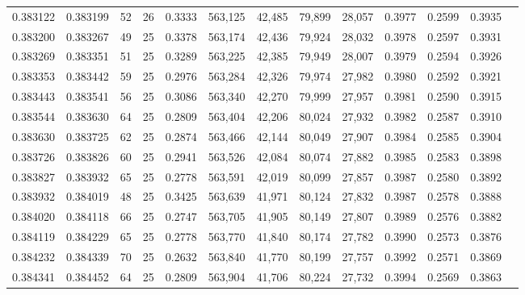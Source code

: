 \begin{tabular}{rrrrrrrrrrrrr}
0.383122 & 0.383199 &    52 &  26 &                                     0.3333 & 563,125 &  42,485 &  79,899 &  28,057 & 0.3977 & 0.2599 & 0.3935 \\
0.383200 & 0.383267 &    49 &  25 &                                     0.3378 & 563,174 &  42,436 &  79,924 &  28,032 & 0.3978 & 0.2597 & 0.3931 \\
0.383269 & 0.383351 &    51 &  25 &                                     0.3289 & 563,225 &  42,385 &  79,949 &  28,007 & 0.3979 & 0.2594 & 0.3926 \\
0.383353 & 0.383442 &    59 &  25 &                                     0.2976 & 563,284 &  42,326 &  79,974 &  27,982 & 0.3980 & 0.2592 & 0.3921 \\
0.383443 & 0.383541 &    56 &  25 &                                     0.3086 & 563,340 &  42,270 &  79,999 &  27,957 & 0.3981 & 0.2590 & 0.3915 \\
0.383544 & 0.383630 &    64 &  25 &                                     0.2809 & 563,404 &  42,206 &  80,024 &  27,932 & 0.3982 & 0.2587 & 0.3910 \\
0.383630 & 0.383725 &    62 &  25 &                                     0.2874 & 563,466 &  42,144 &  80,049 &  27,907 & 0.3984 & 0.2585 & 0.3904 \\
0.383726 & 0.383826 &    60 &  25 &                                     0.2941 & 563,526 &  42,084 &  80,074 &  27,882 & 0.3985 & 0.2583 & 0.3898 \\
0.383827 & 0.383932 &    65 &  25 &                                     0.2778 & 563,591 &  42,019 &  80,099 &  27,857 & 0.3987 & 0.2580 & 0.3892 \\
0.383932 & 0.384019 &    48 &  25 &                                     0.3425 & 563,639 &  41,971 &  80,124 &  27,832 & 0.3987 & 0.2578 & 0.3888 \\
0.384020 & 0.384118 &    66 &  25 &                                     0.2747 & 563,705 &  41,905 &  80,149 &  27,807 & 0.3989 & 0.2576 & 0.3882 \\
0.384119 & 0.384229 &    65 &  25 &                                     0.2778 & 563,770 &  41,840 &  80,174 &  27,782 & 0.3990 & 0.2573 & 0.3876 \\
0.384232 & 0.384339 &    70 &  25 &                                     0.2632 & 563,840 &  41,770 &  80,199 &  27,757 & 0.3992 & 0.2571 & 0.3869 \\
0.384341 & 0.384452 &    64 &  25 &                                     0.2809 & 563,904 &  41,706 &  80,224 &  27,732 & 0.3994 & 0.2569 & 0.3863 \\

\end{tabular}
